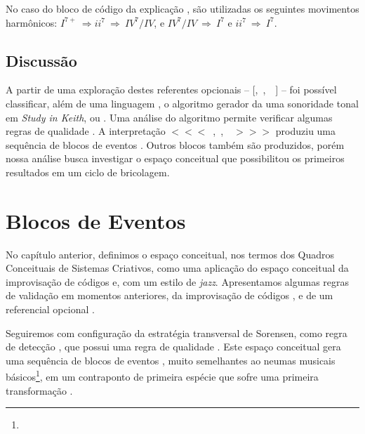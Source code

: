 No caso do bloco de código da explicação , são utilizadas os seguintes movimentos harmônicos: $I^{7+}~\Rightarrow ii^{7}~\Rightarrow~IV^{7}/IV$, e $IV^{7}/IV~\Rightarrow~I^{7}$ e $ii^{7}~\Rightarrow~I^{7}$.

\subsection*{Discussão}

A partir de uma exploração destes referentes opcionais -- $[$,~,~~$]$ -- foi possível classificar, além de uma linguagem , o algoritmo gerador da uma sonoridade tonal em \emph{Study in Keith}, ou  . Uma análise do algoritmo permite verificar algumas regras de qualidade . A interpretação $<<<$~,~,~~$>>>$ produziu uma sequência de blocos de eventos  . Outros blocos também são produzidos, porém nossa análise busca investigar o espaço conceitual que possibilitou os primeiros resultados em um ciclo de bricolagem.


\section{Blocos de Eventos}\label{sec:eventos}

No capítulo anterior, definimos o espaço conceitual, nos termos dos Quadros Conceituais de Sistemas Criativos, como uma aplicação do espaço conceitual da improvisação de códigos e, com um estilo de \emph{jazz}. Apresentamos algumas regras de validação em momentos anteriores, da improvisação de códigos , e de um referencial opcional .

Seguiremos com configuração da estratégia transversal de Sorensen, como regra de detecção , que possui uma regra de qualidade  . Este espaço conceitual gera uma sequência de blocos de eventos , muito semelhantes ao neumas musicais básicos\footnote{}, em um contraponto de primeira espécie que sofre uma primeira transformação . 

